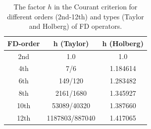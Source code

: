 \begin{table}[hbt]
\caption{\label{courant.1} The factor $h$ in the Courant criterion for different orders (2nd-12th) and types (Taylor and Holberg) of FD operators.}
\centering
\begin{tabular}{c|c|c}
\textbf{FD-order} & \textbf{h (Taylor)}      & \textbf{h (Holberg)} \\ \hline
2nd   &   1.0             &  1.0        \\
4th   &   7/6             &  1.184614   \\
6th   &   149/120         &  1.283482   \\
8th   &   2161/1680       &  1.345927   \\
10th  &   53089/40320     &  1.387660   \\
12th  &   1187803/887040  &  1.417065    
\end{tabular}
\end{table} 
